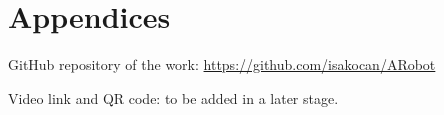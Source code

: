\documentclass[11pt,a4paper]{article}
\begin{document}

\newpage
{}
\renewcommand{\bibname}{References}



\newpage
\appendix
\section{Appendices}
GitHub repository of the work: \url{https://github.com/isakocan/ARobot}

Video link and QR code: to be added in a later stage.
\end{document}
